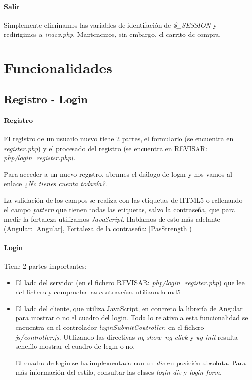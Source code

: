 \documentclass{apuntes}
\begin{document}
\paragraph{Salir}

Simplemente eliminamos las variables de identifación de \textit{\$\_SESSION} y redirigimos a \textit{index.php}. Mantenemos, sin embargo, el carrito de compra.


\section{Funcionalidades}

\subsection{Registro - Login}

\paragraph{Registro}

El registro de un usuario nuevo tiene 2 partes, el formulario (se encuentra en \textit{register.php}) y el procesado del registro (se encuentra en REVISAR: \textit{php/login\_register.php}).

Para acceder a un nuevo registro, abrimos el diálogo de login y nos vamos al enlace \textit{¿No tienes cuenta todavía?}. 

La validación de los campos se realiza con las etiquetas de HTML5 o rellenando el campo \textit{pattern} que tienen todas las etiquetas, salvo la contraseña, que para medir la fortaleza utilizamos \textit{JavaScript}. Hablamos de esto más adelante (Angular: \ref{Angular}, Fortaleza de la contraseña: \ref{PasStrength})

\paragraph{Login}

Tiene 2 partes importantes:

\begin{itemize}

\item El lado del servidor (en el fichero REVISAR: \textit{php/login\_register.php}) que lee del fichero y comprueba las contraseñas utilizando md5.

\item El lado del cliente, que utiliza JavaScript, en concreto la librería de Angular para mostrar o no el cuadro del login. Todo lo relativo a esta funcionalidad se encuentra en el controlador \textit{loginSubmitController}, en el fichero \textit{js/controller.js}. Utilizando las directivas \textit{ng-show}, \textit{ng-click} y \textit{ng-init} resulta sencillo mostrar el cuadro de login o no. 

El cuadro de login se ha implementado con un \textit{div} en posición absoluta. Para más información del estilo, consultar las clases \textit{login-div} y \textit{login-form}.

\end{itemize}
\end{document}
